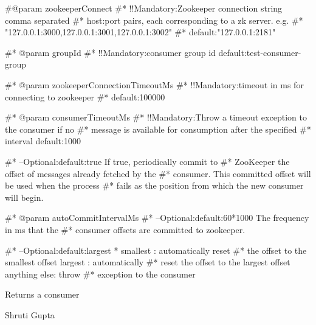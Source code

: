 \documentclass[letterpaper]{book}
\begin{document}
\begin{Arguments}
\begin{ldescription}
\item[\code{zookeeperConnect}] 
\#@param zookeeperConnect
\#*            !!Mandatory:Zookeeper connection string comma separated
\#*            host:port pairs, each corresponding to a zk server. e.g.
\#*            "127.0.0.1:3000,127.0.0.1:3001,127.0.0.1:3002"
\#*  		  default:"127.0.0.1:2181"

\item[\code{groupId}] 
\#* @param groupId
\#*            !!Mandatory:consumer group id default:test-consumer-group

\item[\code{zookeeperConnectionTimeoutMs}] 
\#* @param zookeeperConnectionTimeoutMs
\#*            !!Mandatory:timeout in ms for connecting to zookeeper
\#*            default:100000

\item[\code{consumerTimeoutMs}] 
\#* @param consumerTimeoutMs
\#*            !!Mandatory:Throw a timeout exception to the consumer if no
\#*            message is available for consumption after the specified
\#*            interval default:1000

\item[\code{autoCommitEnable}] 
\#*            --Optional:default:true If true, periodically commit to
\#*            ZooKeeper the offset of messages already fetched by the
\#*            consumer. This committed offset will be used when the process
\#*            fails as the position from which the new consumer will begin.

\item[\code{autoCommitInterval}] 
\#* @param autoCommitIntervalMs
\#*            --Optional:default:60*1000 The frequency in ms that the
\#*            consumer offsets are committed to zookeeper.

\item[\code{autoOffsetReset}] 
\#*            --Optional:default:largest * smallest : automatically reset
\#*            the offset to the smallest offset largest : automatically
\#*            reset the offset to the largest offset anything else: throw
\#*            exception to the consumer


\end{ldescription}
\end{Arguments}
%
\begin{Value}
Returns a consumer
\end{Value}
%
\begin{Author}\relax
Shruti Gupta
\end{Author}
\end{document}
